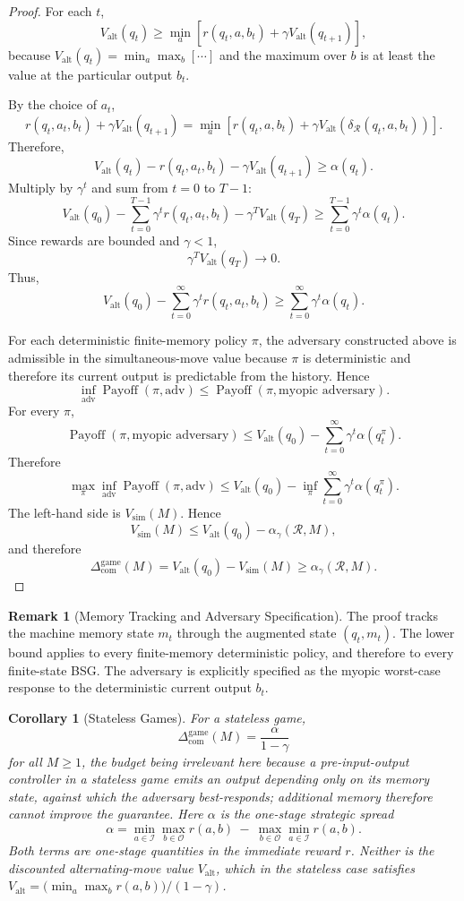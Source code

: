 \documentclass[12pt]{article}
\newtheorem{corollary}[theorem]{Corollary}
\theoremstyle{definition}
\newtheorem{remark}[theorem]{Remark}
\newcommand{\ComGame}{\Delta_{\mathrm{com}}^{\mathrm{game}}}
\newcommand{\Valt}{V_{\mathrm{alt}}}
\newcommand{\Vsim}{V_{\mathrm{sim}}}
\begin{document}
\begin{proof}
For each $t$,
\[
\Valt(q_t)
\ge
\min_a
\left[
r(q_t,a,b_t)+\gamma \Valt(q_{t+1})
\right],
\]
because $\Valt(q_t)=\min_a\max_b[\cdots]$ and the maximum over $b$ is at least the
value at the particular output $b_t$.

By the choice of $a_t$,
\[
r(q_t,a_t,b_t)+\gamma \Valt(q_{t+1})
=
\min_a
\left[
r(q_t,a,b_t)+\gamma \Valt(\delta_{\mathcal R}(q_t,a,b_t))
\right].
\]
Therefore,
\[
\Valt(q_t)-r(q_t,a_t,b_t)-\gamma \Valt(q_{t+1})
\ge
\alpha(q_t).
\]
Multiply by $\gamma^t$ and sum from $t=0$ to $T-1$:
\[
\Valt(q_0)
-
\sum_{t=0}^{T-1}\gamma^t r(q_t,a_t,b_t)
-
\gamma^T \Valt(q_T)
\ge
\sum_{t=0}^{T-1}\gamma^t\alpha(q_t).
\]
Since rewards are bounded and $\gamma<1$,
\[
\gamma^T \Valt(q_T)\to0.
\]
Thus,
\[
\Valt(q_0)
-
\sum_{t=0}^{\infty}\gamma^t r(q_t,a_t,b_t)
\ge
\sum_{t=0}^{\infty}\gamma^t\alpha(q_t).
\]

For each deterministic finite-memory policy $\pi$, the adversary constructed
above is admissible in the simultaneous-move value because $\pi$ is
deterministic and therefore its current output is predictable from the
history.  Hence
\[
\inf_{\text{adv}} \operatorname{Payoff}(\pi,\text{adv})
\le
\operatorname{Payoff}(\pi,\text{myopic adversary}).
\]
For every $\pi$,
\[
\operatorname{Payoff}(\pi,\text{myopic adversary})
\le
\Valt(q_0)-\sum_{t=0}^{\infty}\gamma^t\alpha(q_t^\pi).
\]
Therefore
\[
\max_{\pi}
\inf_{\text{adv}} \operatorname{Payoff}(\pi,\text{adv})
\le
\Valt(q_0)
-
\inf_{\pi}
\sum_{t=0}^{\infty}\gamma^t\alpha(q_t^\pi).
\]
The left-hand side is $\Vsim(M)$.  Hence
\[
\Vsim(M)
\le
\Valt(q_0)-\alpha_\gamma(\mathcal R,M),
\]
and therefore
\[
\ComGame(M)
=
\Valt(q_0)-\Vsim(M)
\ge
\alpha_\gamma(\mathcal R,M).
\]
\end{proof}

\begin{remark}[Memory Tracking and Adversary Specification]
\label{rem:strategic-proof-tracking}
The proof tracks the machine memory state $m_t$ through the augmented state
$(q_t,m_t)$.  The lower bound applies to every finite-memory deterministic
policy, and therefore to every finite-state BSG.  The adversary is explicitly
specified as the myopic worst-case response to the deterministic current
output $b_t$.
\end{remark}

\begin{corollary}[Stateless Games]
\label{cor:stateless}
For a stateless game,
\[
\ComGame(M)
=
\frac{\alpha}{1-\gamma}
\]
for all $M\ge1$, the budget being irrelevant here because a pre-input-output
controller in a stateless game emits an output depending only on its memory
state, against which the adversary best-responds; additional memory therefore
cannot improve the guarantee.  Here $\alpha$ is the \emph{one-stage} strategic
spread
\[
\alpha
=
\min_{a\in\mathcal I}\max_{b\in\mathcal O}r(a,b)
\ -\
\max_{b\in\mathcal O}\min_{a\in\mathcal I}r(a,b).
\]
Both terms are one-stage quantities in the immediate reward $r$.  Neither is
the discounted alternating-move value $\Valt$, which in the stateless case
satisfies $\Valt=\bigl(\min_a\max_br(a,b)\bigr)/(1-\gamma)$.
\end{corollary}
\end{document}
